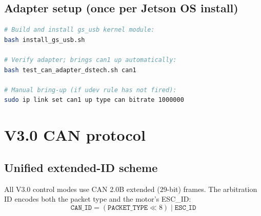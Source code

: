 \documentclass[11pt,a4paper]{article}
\begin{document}
\subsection{Adapter setup (once per Jetson OS install)}

\begin{lstlisting}[language=bash, numbers=none]
# Build and install gs_usb kernel module:
bash install_gs_usb.sh

# Verify adapter; brings can1 up automatically:
bash test_can_adapter_dstech.sh can1

# Manual bring-up (if udev rule has not fired):
sudo ip link set can1 up type can bitrate 1000000
\end{lstlisting}

\section{V3.0 CAN protocol}
\label{sec:v3}

\subsection{Unified extended-ID scheme}

All V3.0 control modes use CAN 2.0B extended (29-bit) frames.
The arbitration ID encodes both the packet type and the motor's ESC\_ID:
\begin{equation}
  \texttt{CAN\_ID} = (\texttt{PACKET\_TYPE} \ll 8) \;|\; \texttt{ESC\_ID}
  \label{eq:canid}
\end{equation}
\end{document}
